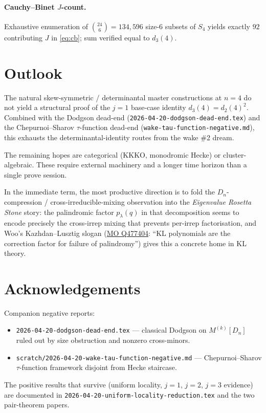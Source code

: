 \documentclass[11pt]{article}
\theoremstyle{definition}
\begin{document}
\paragraph{Cauchy--Binet $J$-count.} Exhaustive enumeration of
$\binom{24}{6} = 134{,}596$ size-$6$ subsets of $S_4$ yields exactly $92$
contributing $J$ in \eqref{eq:cb}; sum verified equal to $d_3(4)$.

\section{Outlook}

The natural skew-symmetric / determinantal master constructions at $n=4$
do not yield a structural proof of the $j=1$ base-case identity $d_3(4) =
d_2(4)^2$. Combined with the Dodgson dead-end (\texttt{2026-04-20-dodgson-dead-end.tex})
and the Chepurnoi--Sharov $\tau$-function dead-end (\texttt{wake-tau-function-negative.md}),
this exhausts the determinantal-identity routes from the wake \#2 dream.

The remaining hopes are categorical (KKKO, monodromic Hecke) or
cluster-algebraic. These require external machinery and a longer time horizon
than a single prove session.

In the immediate term, the most productive direction is to fold the
$D_n$-compression / cross-irreducible-mixing observation into the
\emph{Eigenvalue Rosetta Stone} story: the palindromic factor $p_\lambda(q)$ in
that decomposition seems to encode precisely the cross-irrep mixing that
prevents per-irrep factorisation, and Woo's Kazhdan--Lusztig slogan
(\href{https://mathoverflow.net/questions/477404}{MO Q477404}: ``KL polynomials
are the correction factor for failure of palindromy'') gives this a concrete
home in KL theory.

\section*{Acknowledgements}

Companion negative reports:
\begin{itemize}
\item \texttt{2026-04-20-dodgson-dead-end.tex} --- classical Dodgson on
$M^{(k)}[D_n]$ ruled out by size obstruction and nonzero cross-minors.
\item \texttt{scratch/2026-04-20-wake-tau-function-negative.md} ---
Chepurnoi--Sharov $\tau$-function framework disjoint from Hecke staircase.
\end{itemize}

The positive results that survive (uniform locality, $j=1$, $j=2$, $j=3$
evidence) are documented in \texttt{2026-04-20-uniform-locality-reduction.tex}
and the two pair-theorem papers.
\end{document}
